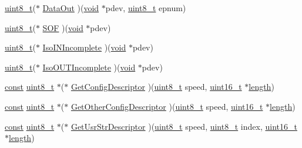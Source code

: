 \begin{DoxyCompactItemize}
\item 
\hyperlink{stdint_8h_aba7bc1797add20fe3efdf37ced1182c5}{uint8\-\_\-t}($\ast$ \hyperlink{struct___device__cb_a420d525bfff88ecb1e819c48251cc6f2}{Data\-Out} )(\hyperlink{group___n_a_m_e_ga18028b8badbf1ea7e704ccac3c488e82}{void} $\ast$pdev, \hyperlink{stdint_8h_aba7bc1797add20fe3efdf37ced1182c5}{uint8\-\_\-t} epnum)
\item 
\hyperlink{stdint_8h_aba7bc1797add20fe3efdf37ced1182c5}{uint8\-\_\-t}($\ast$ \hyperlink{struct___device__cb_aa466062cecbfcca282201c92c6c6c644}{S\-O\-F} )(\hyperlink{group___n_a_m_e_ga18028b8badbf1ea7e704ccac3c488e82}{void} $\ast$pdev)
\item 
\hyperlink{stdint_8h_aba7bc1797add20fe3efdf37ced1182c5}{uint8\-\_\-t}($\ast$ \hyperlink{struct___device__cb_a0edbe34c35d5d64485f293448aa8cae6}{Iso\-I\-N\-Incomplete} )(\hyperlink{group___n_a_m_e_ga18028b8badbf1ea7e704ccac3c488e82}{void} $\ast$pdev)
\item 
\hyperlink{stdint_8h_aba7bc1797add20fe3efdf37ced1182c5}{uint8\-\_\-t}($\ast$ \hyperlink{struct___device__cb_aa3104ec3940cc254286c6f93ee23b632}{Iso\-O\-U\-T\-Incomplete} )(\hyperlink{group___n_a_m_e_ga18028b8badbf1ea7e704ccac3c488e82}{void} $\ast$pdev)
\item 
\hyperlink{group___n_a_m_e_ga7ae6d0e43244213b34de2c2b9aa30da6}{const} \hyperlink{stdint_8h_aba7bc1797add20fe3efdf37ced1182c5}{uint8\-\_\-t} $\ast$($\ast$ \hyperlink{struct___device__cb_a1a422e4eaf53cfd3d4208ddf7fdb64a1}{Get\-Config\-Descriptor} )(\hyperlink{stdint_8h_aba7bc1797add20fe3efdf37ced1182c5}{uint8\-\_\-t} speed, \hyperlink{stdint_8h_a273cf69d639a59973b6019625df33e30}{uint16\-\_\-t} $\ast$\hyperlink{mavlink__helpers_8h_a4254bfa282bd215965d99b8d6b527a04}{length})
\item 
\hyperlink{group___n_a_m_e_ga7ae6d0e43244213b34de2c2b9aa30da6}{const} \hyperlink{stdint_8h_aba7bc1797add20fe3efdf37ced1182c5}{uint8\-\_\-t} $\ast$($\ast$ \hyperlink{struct___device__cb_abcc9a422a304094e617d53181185e242}{Get\-Other\-Config\-Descriptor} )(\hyperlink{stdint_8h_aba7bc1797add20fe3efdf37ced1182c5}{uint8\-\_\-t} speed, \hyperlink{stdint_8h_a273cf69d639a59973b6019625df33e30}{uint16\-\_\-t} $\ast$\hyperlink{mavlink__helpers_8h_a4254bfa282bd215965d99b8d6b527a04}{length})
\item 
\hyperlink{group___n_a_m_e_ga7ae6d0e43244213b34de2c2b9aa30da6}{const} \hyperlink{stdint_8h_aba7bc1797add20fe3efdf37ced1182c5}{uint8\-\_\-t} $\ast$($\ast$ \hyperlink{struct___device__cb_a5809d0b352a170d39c3ec15fa9070d15}{Get\-Usr\-Str\-Descriptor} )(\hyperlink{stdint_8h_aba7bc1797add20fe3efdf37ced1182c5}{uint8\-\_\-t} speed, \hyperlink{stdint_8h_aba7bc1797add20fe3efdf37ced1182c5}{uint8\-\_\-t} index, \hyperlink{stdint_8h_a273cf69d639a59973b6019625df33e30}{uint16\-\_\-t} $\ast$\hyperlink{mavlink__helpers_8h_a4254bfa282bd215965d99b8d6b527a04}{length})
\end{DoxyCompactItemize}



